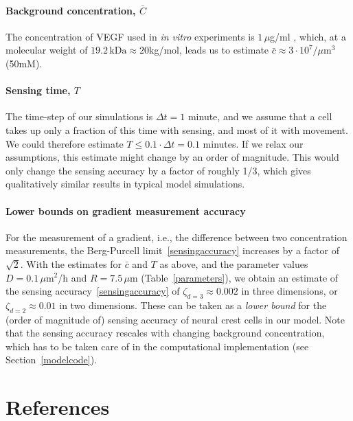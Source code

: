 \documentclass[review]{elsarticle}
\begin{document}
        \paragraph{Background concentration, $\bar{C}$} The concentration of VEGF used in \textsl{in vitro} experiments is $1\,\mu$g/ml \cite{McLennan2010}, which, at a molecular weight of $19.2\,\mathrm{kDa}\approx20$kg/mol, leads us to estimate $\bar{c}\approx 3\cdot10^7/\mu$m$^3$ (50mM).
        
        \paragraph{Sensing time, $T$} The time-step of our simulations is $\Delta t = 1$ minute, and we assume that a cell takes up only a fraction of this time with sensing, and most of it with movement. We could therefore estimate $T \leq 0.1\cdot\Delta t=0.1$ minutes. If we relax our assumptions, this estimate might change by an order of magnitude. This would only change the sensing accuracy by a factor of roughly 1/3, which gives qualitatively similar results in typical model simulations.
        
        \paragraph{Lower bounds on gradient measurement accuracy} For the measurement of a gradient, i.e., the difference between two concentration measurements, the Berg-Purcell limit~\eqref{sensingaccuracy} increases by a factor of $\sqrt{2}$.%
        With the estimates for $\bar{c}$ and $T$ as above, and the parameter values $D=0.1\,\mu$m$^2$/h and $R=7.5\,\mu$m (Table~\ref{parameters}), we obtain an estimate of the sensing accuracy~\eqref{sensingaccuracy} of $\zeta_{d=3}\approx 0.002$ in three dimensions, or $\zeta_{d=2}\approx 0.01$ in two dimensions. These can be taken as a \emph{lower bound} for the (order of magnitude of) sensing accuracy of neural crest cells in our model. Note that the sensing accuracy rescales with changing background concentration, which has to be taken care of in the computational implementation (see Section~\ref{modelcode}). 
        
\clearpage
\section*{References}

\end{document}

